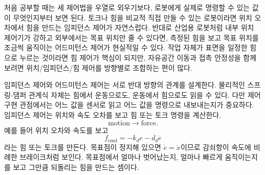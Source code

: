 처음 공부할 때는 세 제어법을 우열로 외우기보다, 로봇에게 실제로 명령할 수 있는 값이 무엇인지부터 보면 된다.
토크나 힘을 비교적 직접 만들 수 있는 로봇이라면 위치 오차에서 힘을 만드는 임피던스 제어가 자연스럽다.
반대로 산업용 로봇처럼 내부 위치 제어기가 강하고 외부에서는 목표 위치만 줄 수 있다면, 측정된 힘을 보고 목표 위치를 조금씩 움직이는 어드미턴스 제어가 현실적일 수 있다.
작업 자체가 표면을 일정한 힘으로 누르는 것이라면 힘 제어가 핵심이 되지만, 자유공간 이동과 접촉 안정성을 함께 보려면 위치/임피던스/힘 제어를 방향별로 조합하는 편이 많다.

임피던스 제어와 어드미턴스 제어는 서로 반대 방향의 관계를 설계한다.
물리적인 스프링-댐퍼 관계식 자체는 힘에서 운동으로도, 운동에서 힘으로도 읽을 수 있다.
다만 제어 구현 관점에서는 어느 값을 센서로 읽고 어느 값을 명령으로 내보내는지가 중요하다.
임피던스 제어는 위치와 속도 오차를 보고 힘 또는 토크 명령을 계산한다.
\begin{equation}
  \text{motion} \rightarrow \text{force}.
\end{equation}
예를 들어 위치 오차와 속도를 보고
\begin{equation}
  f_{\mathrm{cmd}}
  =
  -k_d e
  -
  d_d\dot{e}
\end{equation}
라는 힘 또는 토크를 만든다.
목표점이 정지해 있으면 $\dot{e}=\dot{x}$이므로 감쇠항이 속도에 비례한 브레이크처럼 보인다.
목표점에서 얼마나 벗어났는지, 얼마나 빠르게 움직이는지를 보고 그만큼 되돌리는 힘을 만드는 셈이다.

